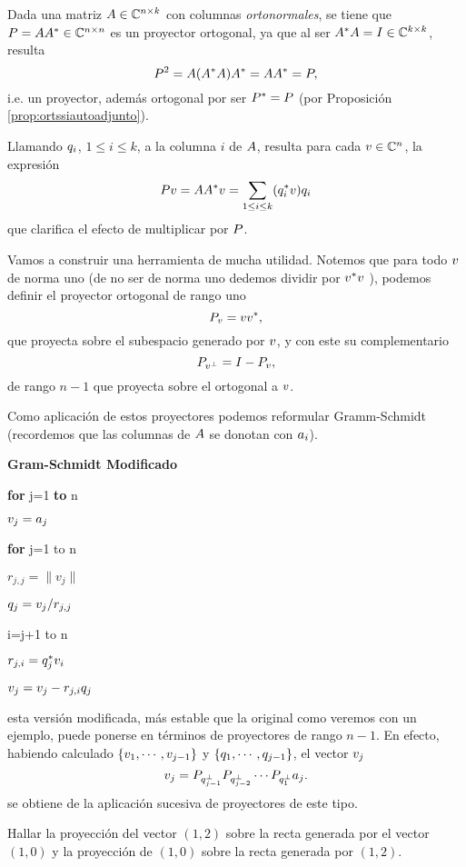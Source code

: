  \begin{tcolorbox}
\begin{rem}
Dada una matriz $\Ab\in\C^{n\times k}$ con columnas \emph{ortonormales}, se tiene que
$\Pb=\Ab\Ab^*\in\C^{n\times n}$ es un proyector ortogonal, ya que al ser $\Ab^*\Ab=\Ib\in \C^{k\times k}$, resulta  $$\Pb^2=\Ab(\Ab^*\Ab)\Ab^*=\Ab\Ab^*=\Pb,$$
i.e. un proyector, además ortogonal por ser
$\Pb^*=\Pb$ (por Proposición \ref{prop:ortssiautoadjunto}).

Llamando $\qb_i$, $1\le i\le k$, a la columna $i$ de $\Ab$, resulta para cada $\vb\in\Cn$, la expresión
$$
\Pb\vb=\Ab\Ab^*\vb=\sum_{1\le i\le k}(\qb_i^*\vb)\qb_i
$$
que clarifica el efecto de multiplicar por $\Pb$.
\end{rem}
\etcc
Vamos a construir una herramienta de  mucha utilidad.  Notemos que para todo $\vb$ de norma uno (de no ser de norma uno dedemos dividir por $\vb^*\vb$ ), podemos definir el proyector ortogonal de rango uno
$$
\Pb_{\vb}=\vb\vb^*,
$$
que proyecta sobre el subespacio generado por $\vb$, y con este su complementario
$$\Pb_{\vb^\perp}=\Ib-\Pb_{\vb},$$
de rango $n-1$ que proyecta sobre el ortogonal a $\vb$.

Como aplicación de estos proyectores podemos reformular Gramm-Schmidt (recordemos que
las columnas de $\Ab$ se donotan con $\ab_i$).
\begin{center}
\begin{tcolorbox}[width=\linewidth/2]
\begin{center}
{\bf Gram-Schmidt Modificado}
 \end{center}

{\bf for} j=1 {\bf to} n

\qquad $\vb_j=\ab_j$

{\bf for} j=1 to n

\qquad $r_{j,j}=\|v_j\|$

\qquad  $\qb_j=\vb_j/r_{j,j}$

 i=j+1 to n

\qquad \qquad$r_{j,i}=\qb^*_j\vb_i$

\qquad \qquad $\vb_{j}=\vb_j - r_{j,i}\qb_j$

\end{tcolorbox}
\end{center}
esta versión modificada,  más estable que la original como veremos con un ejemplo, puede ponerse en términos de proyectores de rango $n-1$. En efecto, habiendo calculado
$\{\vb_1,\cdots,\vb_{j-1}\}$ y $\{\qb_1,\cdots,\qb_{j-1}\}$, el vector $\vb_j$
$$
\vb_j=\Pb_{\qb_{j-1}^{\perp}}\Pb_{\qb_{j-2}^{\perp}}\cdots \Pb_{\qb_{1}^{\perp}}\ab_j.
$$
se obtiene de la aplicación sucesiva de proyectores de este tipo.
\begin{ej}
Hallar la proyección del vector $(1,2)$ sobre la recta generada por el vector $(1,0)$ y la proyección de $(1,0)$ sobre la recta generada por $(1,2)$.


\end{ej}
\end{tcolorbox}

